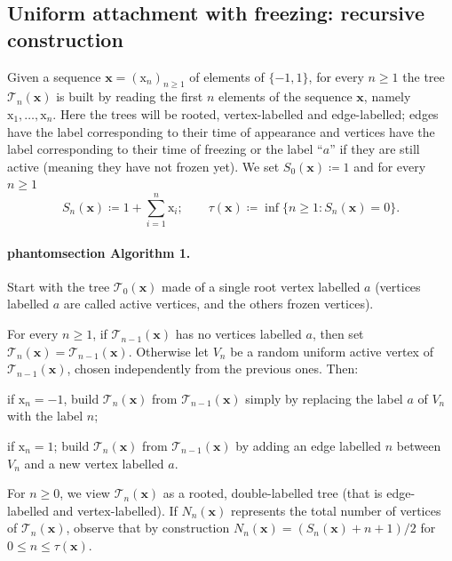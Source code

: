 \documentclass[11pt]{article}
\makeatletter
\theoremstyle{plain}
\theoremstyle{definition}
\theoremstyle{remark}
\newcommand{\labeltext}[3][]{%
    \@bsphack%
    \csname phantomsection\endcsname%
    \def\tst{#1}%
    \def\labelmarkup{\textcolor{link}}%
    \def\refmarkup{}%
    \ifx\tst\empty\def\@currentlabel{\refmarkup{#2}}{\label{#3}}%
    \else\def\@currentlabel{\refmarkup{#1}}{\label{#3}}\fi%
    \@esphack%
    \labelmarkup{#2}%
}
\newcommand{\1}{\mathbbm{1}} %
\newcommand{\T}{\mathcal{T}} %
\newcommand{\Xb}{\mathrm{\mathbf{x}}} %
\newcommand{\X}{\mathrm x} %
\makeatother
\begin{document}
\subsection{Uniform attachment with freezing: recursive construction}
\label{ssec:def}

Given a sequence $\Xb=(\X_n)_{n \geq 1}$  of elements of $\{-1,1\}$, for every $n \geq 1$ the tree $\T_n(\Xb)$ is built by  reading the first $n$ elements of the sequence $\Xb$, namely $\X_1,\dots,\X_n$. Here the trees will be rooted, vertex-labelled and edge-labelled; edges have the label corresponding to their time of appearance and vertices have the label corresponding to their time of freezing or the label ``$a$'' if they are still active (meaning they have not frozen yet). We set $S_{0}(\Xb) \coloneqq1$ and for every $n \geq 1$
\begin{equation}
\label{eq:defSn}S_n(\Xb) \coloneqq 1+ \sum_{i=1}^n \X_i; \qquad \tau(\Xb) \coloneqq \inf \{n \geq 1 : S_{n}(\Xb)=0\}.
\end{equation}

\paragraph{\labeltext[1]{Algorithm 1.}{algo1}}
\begin{compitem}
\item Start with the tree $\T_0(\Xb)$ made of a single root vertex labelled $a$ (vertices labelled $a$ are called active vertices, and the others frozen vertices).
\item For every $n \geq 1$, if $\T_{n-1}(\Xb)$ has no vertices labelled $a$, then set $\T_n(\Xb) = \T_{n-1}(\Xb)$. Otherwise let $V_n$ be a random uniform active vertex of $\T_{n-1}(\Xb)$, chosen independently from the previous ones. Then:
\begin{compitem}
\item[--] if $\X_n=-1$, build $\T_n(\Xb)$ from $\T_{n-1}(\Xb)$ simply by replacing the label $a$ of $V_n$ with the label $n$;
\item[--] if $\X_n=1$;  build $\T_n(\Xb)$ from $\T_{n-1}(\Xb)$ by adding an edge labelled $n$ between $V_n$ and a new vertex labelled $a$. 
\end{compitem}
\end{compitem}
{For $n \geq 0$, we view $\T_n(\Xb)$ as a rooted, double-labelled tree (that is edge-labelled and vertex-labelled). If $N_{n}(\Xb)$ represents the total number of vertices  of $\T_n(\Xb)$, observe that by construction $N_n(\Xb)=(S_n(\Xb)+n+1)/2$ for $0 \leq n \leq \tau(\Xb)$.} 
\end{document}
